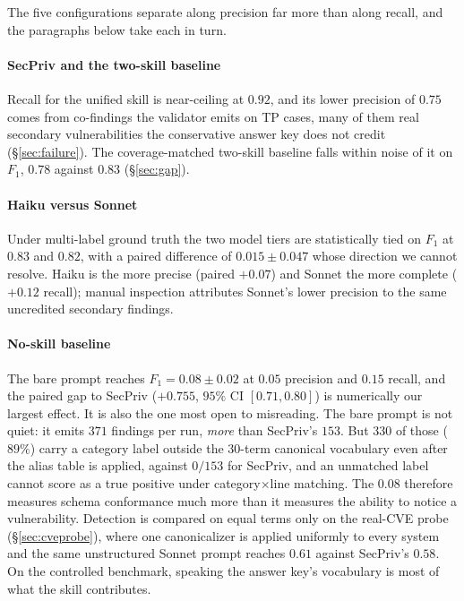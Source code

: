 \documentclass[runningheads]{llncs}
\begin{document}
The five configurations separate along precision far more than along recall, and the paragraphs below take each in turn.

\paragraph{SecPriv and the two-skill baseline} Recall for the unified skill is near-ceiling at $0.92$, and its lower precision of $0.75$ comes from co-findings the validator emits on TP cases, many of them real secondary vulnerabilities the conservative answer key does not credit (\S\ref{sec:failure}). The coverage-matched two-skill baseline falls within noise of it on $F_1$, $0.78$ against $0.83$ (\S\ref{sec:gap}).

\paragraph{Haiku versus Sonnet} Under multi-label ground truth the two model tiers are statistically tied on $F_1$ at $0.83$ and $0.82$, with a paired difference of $0.015 \pm 0.047$ whose direction we cannot resolve. Haiku is the more precise (paired $+0.07$) and Sonnet the more complete ($+0.12$ recall); manual inspection attributes Sonnet's lower precision to the same uncredited secondary findings.

\paragraph{No-skill baseline} The bare prompt reaches $F_1 = 0.08 \pm 0.02$ at $0.05$ precision and $0.15$ recall, and the paired gap to SecPriv ($+0.755$, $95\%$ CI $[0.71,0.80]$) is numerically our largest effect. It is also the one most open to misreading. The bare prompt is not quiet: it emits $371$ findings per run, \emph{more} than SecPriv's $153$. But $330$ of those ($89\%$) carry a category label outside the $30$-term canonical vocabulary even after the alias table is applied, against $0/153$ for SecPriv, and an unmatched label cannot score as a true positive under category$\times$line matching. The $0.08$ therefore measures schema conformance much more than it measures the ability to notice a vulnerability. Detection is compared on equal terms only on the real-CVE probe (\S\ref{sec:cveprobe}), where one canonicalizer is applied uniformly to every system and the same unstructured Sonnet prompt reaches $0.61$ against SecPriv's $0.58$. On the controlled benchmark, speaking the answer key's vocabulary is most of what the skill contributes.
\end{document}
